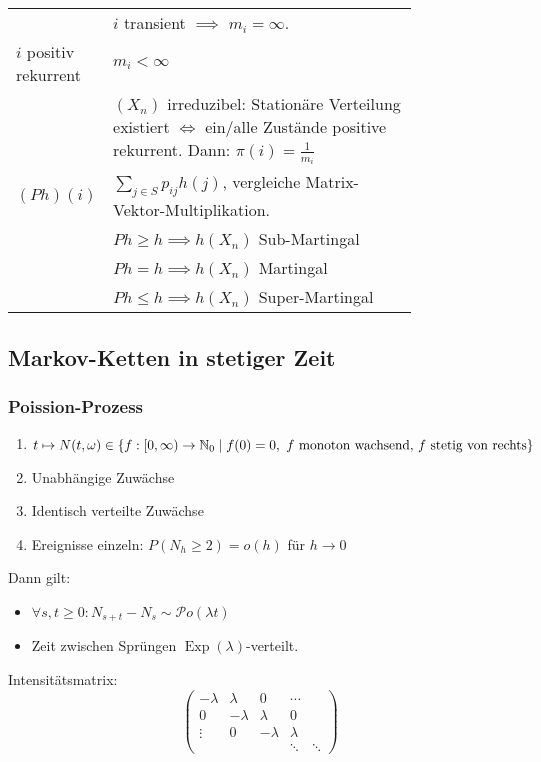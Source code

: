 \documentclass[a4paper,DIV15]{scrartcl}
\begin{document}
\begin{longtable}[h]{lp{0.8\linewidth}}
	& $i$ transient $\implies$ $m_i=\infty$.\\
$i$ positiv rekurrent 
	& $m_i<\infty$ \\
	& $(X_n)$ irreduzibel: Stationäre Verteilung existiert $\iff$ ein/alle Zustände positive rekurrent. Dann: $\pi(i)=\frac1{m_i}$ \\
$(Ph)(i)$
	& $\sum_{j\in S} p_{ij}h(j)$, vergleiche Matrix-Vektor-Multiplikation. \\
	& $Ph \ge h \implies h(X_n)$ Sub-Martingal\\
	& $Ph = h \implies h(X_n)$ Martingal\\
	& $Ph \le h \implies h(X_n)$ Super-Martingal\\
\end{longtable}

\subsection{Markov-Ketten in stetiger Zeit}

\subsubsection{Poission-Prozess}
\begin{enumerate}[({A}1)]
\item $t\mapsto N(t,\omega)\in \{f:[0,\infty) \to \mathbb{N}_0\mid f(0)=0,\text{ $f$ monoton wachsend, $f$ stetig von rechts}\}$
\item Unabhängige Zuwächse
\item Identisch verteilte Zuwächse
\item Ereignisse einzeln: $P(N_h\ge 2) = o(h)$ für $h\to 0$
\end{enumerate}

Dann gilt:
\begin{itemize}
\item $\forall s,t\ge 0:N_{s+t}-N_s \sim \mathcal Po(\lambda t)$
\item Zeit zwischen Sprüngen $\operatorname{Exp}(\lambda)$-verteilt.
\end{itemize}

Intensitätsmatrix:
\[
\begin{pmatrix}
-\lambda & \lambda & 0 & \cdots \\
0 & -\lambda & \lambda & 0 & \\
\vdots & 0 & -\lambda & \lambda & \\
& & & \ddots & \ddots 
\end{pmatrix}
\]
\end{document}
